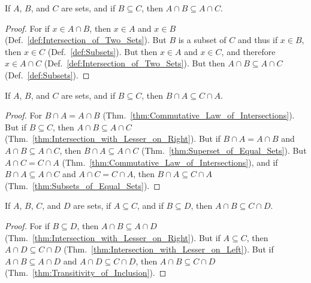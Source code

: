         \begin{theorem}
            \label{thm:Intersection_with_Lesser_on_Right}%
            If $A$, $B$, and $C$ are sets, and if $B\subseteq{C}$, then
            $A\cap{B}\subseteq{A}\cap{C}$.
        \end{theorem}
        \begin{proof}
            For if $x\in{A}\cap{B}$, then $x\in{A}$ and $x\in{B}$
            (Def.~\ref{def:Intersection_of_Two_Sets}). But $B$ is a subset of
            $C$ and thus if $x\in{B}$, then $x\in{C}$ (Def.~\ref{def:Subsets}).
            But then $x\in{A}$ and $x\in{C}$, and therefore $x\in{A}\cap{C}$
            (Def.~\ref{def:Intersection_of_Two_Sets}). But
            then $A\cap{B}\subseteq{A}\cap{C}$ (Def.~\ref{def:Subsets}).
        \end{proof}
        \begin{theorem}
            \label{thm:Intersection_with_Lesser_on_Left}%
            If $A$, $B$, and $C$ are sets, and if $B\subseteq{C}$, then
            $B\cap{A}\subseteq{C}\cap{A}$.
        \end{theorem}
        \begin{proof}
            For $B\cap{A}=A\cap{B}$
            (Thm.~\ref{thm:Commutative_Law_of_Intersections}). But if
            $B\subseteq{C}$, then $A\cap{B}\subseteq{A}\cap{C}$
            (Thm.~\ref{thm:Intersection_with_Lesser_on_Right}). But if
            $B\cap{A}=A\cap{B}$ and $A\cap{B}\subseteq{A}\cap{C}$, then
            $B\cap{A}\subseteq{A}\cap{C}$
            (Thm.~\ref{thm:Superset_of_Equal_Sets}). But $A\cap{C}=C\cap{A}$
            (Thm.~\ref{thm:Commutative_Law_of_Intersections}), and if
            $B\cap{A}\subseteq{A}\cap{C}$ and $A\cap{C}=C\cap{A}$, then
            $B\cap{A}\subseteq{C}\cap{A}$
            (Thm.~\ref{thm:Subsets_of_Equal_Sets}).
        \end{proof}
        \begin{theorem}
            \label{thm:A_cap_B_Subset_C_cap_D}%
            If $A$, $B$, $C$, and $D$ are sets, if $A\subseteq{C}$, and if
            $B\subseteq{D}$, then $A\cap{B}\subseteq{C}\cap{D}$.
        \end{theorem}
        \begin{proof}
            For if $B\subseteq{D}$, then $A\cap{B}\subseteq{A}\cap{D}$
            (Thm.~\ref{thm:Intersection_with_Lesser_on_Right}). But if
            $A\subseteq{C}$, then $A\cap{D}\subseteq{C}\cap{D}$
            (Thm.~\ref{thm:Intersection_with_Lesser_on_Left}). But if
            $A\cap{B}\subseteq{A}\cap{D}$ and $A\cap{D}\subseteq{C}\cap{D}$,
            then $A\cap{B}\subseteq{C}\cap{D}$
            (Thm.~\ref{thm:Transitivity_of_Inclusion}).
        \end{proof}
